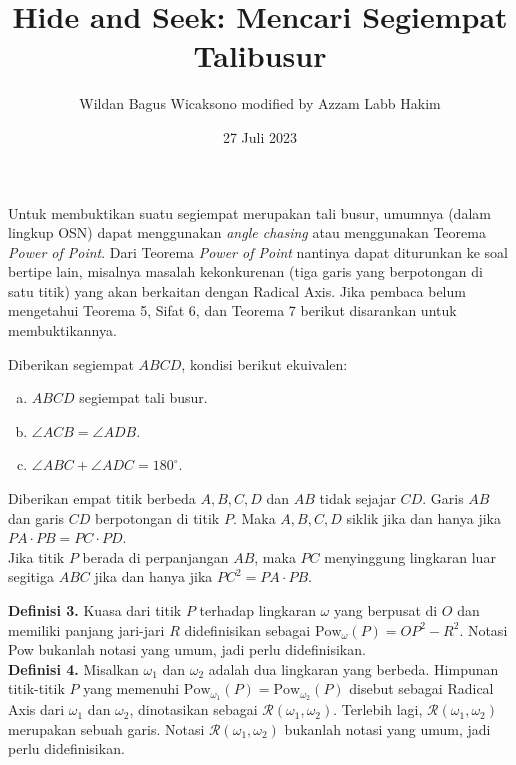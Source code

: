 \documentclass[a4paper, 11pt]{article}
\title{\textbf{Hide and Seek: Mencari Segiempat Talibusur}}
\author{Wildan Bagus Wicaksono modified by Azzam Labb Hakim}
\date{27 Juli 2023}
\begin{document}
\maketitle

Untuk membuktikan suatu segiempat merupakan tali busur, umumnya (dalam lingkup OSN) dapat menggunakan \textit{angle chasing} atau menggunakan Teorema \textit{Power of Point}. Dari Teorema \textit{Power of Point} nantinya dapat diturunkan ke soal bertipe lain, misalnya masalah kekonkurenan (tiga garis yang berpotongan di satu titik) yang akan berkaitan dengan Radical Axis. Jika pembaca belum mengetahui Teorema 5, Sifat 6, dan Teorema 7 berikut disarankan untuk membuktikannya.
\begin{tcolorbox}[colback=blue!5!white,colframe=blue!75!black,title=\textbf{Teorema 1}]
  Diberikan segiempat $ABCD$, kondisi berikut ekuivalen:
\begin{enumerate}[(a).]
\item $ABCD$ segiempat tali busur.
\item $\angle ACB=\angle ADB$.
\item $\angle ABC+\angle ADC=180^\circ$.
\end{enumerate}
\end{tcolorbox}
\begin{tcolorbox}[colback=blue!5!white,colframe=blue!75!black,title=\textbf{Teorema 2: Power of Point Theorem}]
 Diberikan empat titik berbeda $A,B,C,D$ dan $AB$ tidak sejajar $CD$. Garis $AB$ dan garis $CD$ berpotongan di titik $P$. Maka $A,B,C,D$ siklik jika dan hanya jika $PA\cdot PB=PC\cdot PD$.\\
Jika titik $P$ berada di perpanjangan $AB$, maka $PC$ menyinggung lingkaran luar segitiga $ABC$ jika dan hanya jika $PC^2=PA\cdot PB$.
\end{tcolorbox}
\noindent\textbf{Definisi 3.} Kuasa dari titik $P$ terhadap lingkaran $\omega$ yang berpusat di $O$ dan memiliki panjang jari-jari $R$ didefinisikan sebagai $\text{Pow}_\omega(P)=OP^2-R^2$. Notasi Pow bukanlah notasi yang umum, jadi perlu didefinisikan.\\
\textbf{Definisi 4.} Misalkan $\omega_1$ dan $\omega_2$ adalah dua lingkaran yang berbeda. Himpunan titik-titik $P$ yang memenuhi $\text{Pow}_{\omega_1}(P)=\text{Pow}_{\omega_2}(P)$ disebut sebagai Radical Axis dari $\omega_1$ dan $\omega_2$, dinotasikan sebagai $\mathcal{R}(\omega_1,\omega_2)$. Terlebih lagi, $\mathcal{R}(\omega_1,\omega_2)$ merupakan sebuah garis. Notasi $\mathcal{R}(\omega_1,\omega_2)$ bukanlah notasi yang umum, jadi perlu didefinisikan.
\end{document}
